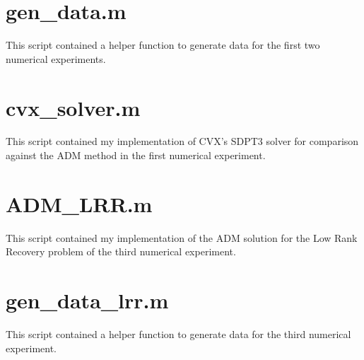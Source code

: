 \documentclass{article}
\begin{document}
\section*{gen\_data.m}
This script contained a helper function to generate data for the first two numerical experiments.

\vspace{10mm}
\section*{cvx\_solver.m}
This script contained my implementation of CVX's SDPT3 solver for comparison against the ADM method in the first numerical experiment.

\section*{ADM\_LRR.m}
This script contained my implementation of the ADM solution for the Low Rank Recovery problem of the third numerical experiment.

\section*{gen\_data\_lrr.m}
This script contained a helper function to generate data for the third numerical experiment.

\end{document}

